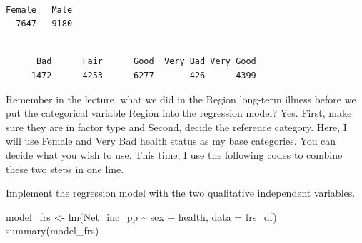 \documentclass[
  letterpaper,
  DIV=11,
  numbers=noendperiod]{scrreprt}
\newenvironment{Shaded}{\begin{snugshade}}{\end{snugshade}}
\newcommand{\AttributeTok}[1]{\textcolor[rgb]{0.40,0.45,0.13}{#1}}
\newcommand{\FunctionTok}[1]{\textcolor[rgb]{0.28,0.35,0.67}{#1}}
\newcommand{\NormalTok}[1]{\textcolor[rgb]{0.00,0.23,0.31}{#1}}
\newcommand{\OtherTok}[1]{\textcolor[rgb]{0.00,0.23,0.31}{#1}}
\newcommand{\SpecialCharTok}[1]{\textcolor[rgb]{0.37,0.37,0.37}{#1}}
\newcommand{\StringTok}[1]{\textcolor[rgb]{0.13,0.47,0.30}{#1}}
\begin{document}
\begin{Shaded}
\end{Shaded}

\begin{verbatim}

Female   Male 
  7647   9180 
\end{verbatim}

\begin{Shaded}
\end{Shaded}

\begin{verbatim}

      Bad      Fair      Good  Very Bad Very Good 
     1472      4253      6277       426      4399 
\end{verbatim}

Remember in the lecture, what we did in the Region long-term illness
before we put the categorical variable Region into the regression model?
Yes. First, make sure they are in factor type and Second, decide the
reference category. Here, I will use Female and Very Bad health status
as my base categories. You can decide what you wish to use. This time, I
use the following codes to combine these two steps in one line.

\begin{Shaded}
\end{Shaded}

Implement the regression model with the two qualitative independent
variables.

\begin{Shaded}
\begin{Highlighting}[]
\NormalTok{model\_frs }\OtherTok{\textless{}{-}} \FunctionTok{lm}\NormalTok{(Net\_inc\_pp }\SpecialCharTok{\textasciitilde{}}\NormalTok{ sex }\SpecialCharTok{+}\NormalTok{ health, }\AttributeTok{data =}\NormalTok{ frs\_df) }
\FunctionTok{summary}\NormalTok{(model\_frs)}
\end{Highlighting}
\end{Shaded}
\end{document}

